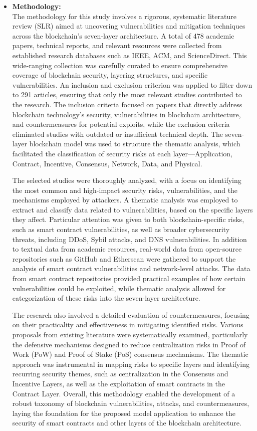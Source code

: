 \documentclass[12pt,a4paper]{article}
\begin{document}
\begin{itemize}
\begin{itemize}
        \item \textbf{Methodology:} \\
The methodology for this study involves a rigorous, systematic literature review (SLR) aimed at uncovering vulnerabilities and mitigation techniques across the blockchain’s seven-layer architecture. A total of 478 academic papers, technical reports, and relevant resources were collected from established research databases such as IEEE, ACM, and ScienceDirect. This wide-ranging collection was carefully curated to ensure comprehensive coverage of blockchain security, layering structures, and specific vulnerabilities. An inclusion and exclusion criterion was applied to filter down to 291 articles, ensuring that only the most relevant studies contributed to the research. The inclusion criteria focused on papers that directly address blockchain technology’s security, vulnerabilities in blockchain architecture, and countermeasures for potential exploits, while the exclusion criteria eliminated studies with outdated or insufficient technical depth. The seven-layer blockchain model was used to structure the thematic analysis, which facilitated the classification of security risks at each layer—Application, Contract, Incentive, Consensus, Network, Data, and Physical.

The selected studies were thoroughly analyzed, with a focus on identifying the most common and high-impact security risks, vulnerabilities, and the mechanisms employed by attackers. A thematic analysis was employed to extract and classify data related to vulnerabilities, based on the specific layers they affect. Particular attention was given to both blockchain-specific risks, such as smart contract vulnerabilities, as well as broader cybersecurity threats, including DDoS, Sybil attacks, and DNS vulnerabilities. In addition to textual data from academic resources, real-world data from open-source repositories such as GitHub and Etherscan were gathered to support the analysis of smart contract vulnerabilities and network-level attacks. The data from smart contract repositories provided practical examples of how certain vulnerabilities could be exploited, while thematic analysis allowed for categorization of these risks into the seven-layer architecture.

The research also involved a detailed evaluation of countermeasures, focusing on their practicality and effectiveness in mitigating identified risks. Various proposals from existing literature were systematically examined, particularly the defensive mechanisms designed to reduce centralization risks in Proof of Work (PoW) and Proof of Stake (PoS) consensus mechanisms. The thematic approach was instrumental in mapping risks to specific layers and identifying recurring security themes, such as centralization in the Consensus and Incentive Layers, as well as the exploitation of smart contracts in the Contract Layer. Overall, this methodology enabled the development of a robust taxonomy of blockchain vulnerabilities, attacks, and countermeasures, laying the foundation for the proposed model application to enhance the security of smart contracts and other layers of the blockchain architecture.


\end{itemize}
\end{itemize}
\end{document}
